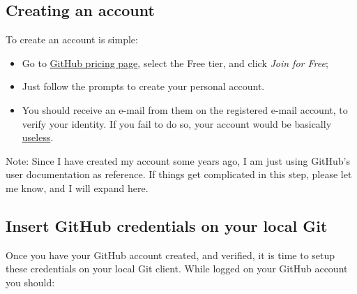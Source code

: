 \documentclass[
]{book}
\providecommand{\tightlist}{%
  \setlength{\itemsep}{0pt}\setlength{\parskip}{0pt}}
\begin{document}
\hypertarget{creating-an-account}{%
\subsection{Creating an account}\label{creating-an-account}}

To create an account is simple:

\begin{itemize}
\tightlist
\item
  Go to \href{https://github.com/pricing}{GitHub pricing page}, select the Free tier,
  and click \emph{Join for Free};
\item
  Just follow the prompts to create your personal account.
\item
  You should receive an e-mail from them on the registered e-mail account, to
  verify your identity. If you fail to do so, your account would be basically \href{https://docs.github.com/en/get-started/signing-up-for-github/verifying-your-email-address\#about-email-verification}{useless}.
\end{itemize}

Note: Since I have created my account some years ago, I am just using GitHub's
user documentation as reference. If things get complicated in this step, please
let me know, and I will expand here.

\hypertarget{insert-github-credentials-on-your-local-git}{%
\subsection{Insert GitHub credentials on your local Git}\label{insert-github-credentials-on-your-local-git}}

Once you have your GitHub account created, and verified, it is time to setup these
credentials on your local Git client. While logged on your GitHub account you should:
\end{document}

